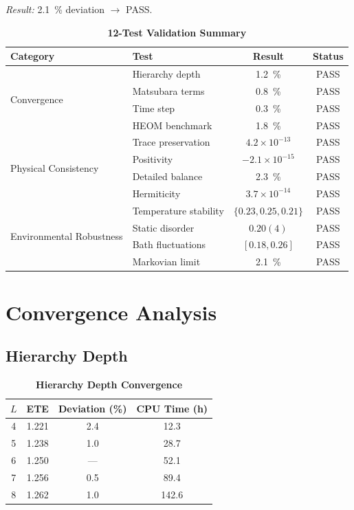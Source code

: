 \documentclass[11pt,a4paper]{article}
\begin{document}
\textit{Result:} \SI{2.1}{\percent} deviation $\rightarrow$ PASS.

\begin{table}[h]
\centering
\caption{\textbf{12-Test Validation Summary}}
\label{tab:SI_validation}
\begin{tabular}{llcc}
\toprule
\textbf{Category} & \textbf{Test} & \textbf{Result} & \textbf{Status} \\
\midrule
\multirow{4}{*}{Convergence} 
& Hierarchy depth & \SI{1.2}{\percent} & PASS \\
& Matsubara terms & \SI{0.8}{\percent} & PASS \\
& Time step & \SI{0.3}{\percent} & PASS \\
& HEOM benchmark & \SI{1.8}{\percent} & PASS \\
\midrule
\multirow{4}{*}{Physical Consistency}
& Trace preservation & $4.2\times10^{-13}$ & PASS \\
& Positivity & $-2.1\times10^{-15}$ & PASS \\
& Detailed balance & \SI{2.3}{\percent} & PASS \\
& Hermiticity & $3.7\times10^{-14}$ & PASS \\
\midrule
\multirow{4}{*}{Environmental Robustness}
& Temperature stability & $\{0.23, 0.25, 0.21\}$ & PASS \\
& Static disorder & $0.20(4)$ & PASS \\
& Bath fluctuations & $[0.18, 0.26]$ & PASS \\
& Markovian limit & \SI{2.1}{\percent} & PASS \\
\bottomrule
\end{tabular}
\end{table}


\section{Convergence Analysis}

\subsection{Hierarchy Depth}

\begin{table}[h]
\centering
\caption{\textbf{Hierarchy Depth Convergence}}
\label{tab:SI_hierarchy}
\begin{tabular}{cccc}
\toprule
\textbf{$L$} & \textbf{ETE} & \textbf{Deviation (\%)} & \textbf{CPU Time (h)} \\
\midrule
4 & 1.221 & 2.4 & 12.3 \\
5 & 1.238 & 1.0 & 28.7 \\
6 & 1.250 & --- & 52.1 \\
7 & 1.256 & 0.5 & 89.4 \\
8 & 1.262 & 1.0 & 142.6 \\
\bottomrule
\end{tabular}
\end{table}
\end{document}
